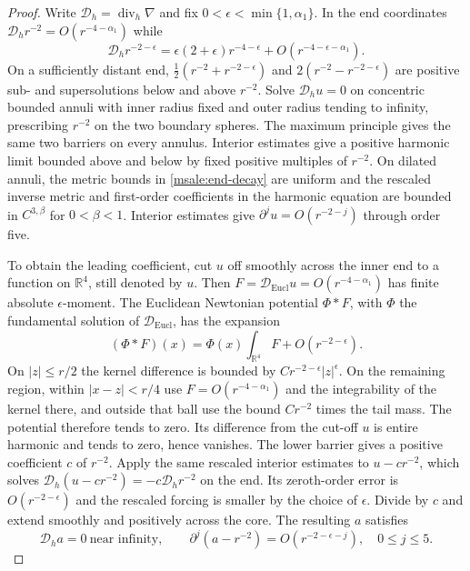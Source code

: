 \documentclass[11pt]{article}
\numberwithin{equation}{section}
\theoremstyle{definition}
\theoremstyle{remark}
\begin{document}
\begin{proof}
Write \(\mathcal D_h=\operatorname{div}_h\nabla\) and fix
\(0<\epsilon<\min\{1,\alpha_1\}\). In the end coordinates
\(\mathcal D_h r^{-2}=O(r^{-4-\alpha_1})\) while
\[
 \mathcal D_h r^{-2-\epsilon}
   =\epsilon(2+\epsilon)r^{-4-\epsilon}
                  +O(r^{-4-\epsilon-\alpha_1}).
\]
On a sufficiently distant end,
\(\tfrac12(r^{-2}+r^{-2-\epsilon})\) and
\(2(r^{-2}-r^{-2-\epsilon})\) are positive sub- and supersolutions
below and above \(r^{-2}\). Solve
\(\mathcal D_h u=0\) on concentric bounded annuli with inner
radius fixed and outer radius tending to infinity, prescribing
\(r^{-2}\) on the two boundary spheres. The maximum principle
gives the same two barriers on every annulus. Interior estimates
give a positive harmonic limit bounded above and below by fixed
positive multiples of \(r^{-2}\). On dilated annuli, the metric
bounds in \eqref{msale:end-decay} are uniform and the rescaled
inverse metric and first-order coefficients in the harmonic
equation are bounded in \(C^{3,\beta}\) for \(0<\beta<1\).
Interior estimates give \(\partial^j u=O(r^{-2-j})\) through
order five.

To obtain the leading coefficient, cut \(u\) off smoothly across
the inner end to a function on \(\mathbb R^4\), still denoted by
\(u\). Then \(F=\mathcal D_{\mathrm{Eucl}}u=O(r^{-4-\alpha_1})\)
has finite absolute \(\epsilon\)-moment. The Euclidean Newtonian
potential \(\Phi*F\), with \(\Phi\) the fundamental solution of
\(\mathcal D_{\mathrm{Eucl}}\), has the expansion
\[
 (\Phi*F)(x)=\Phi(x)\int_{\mathbb R^4}F+O(r^{-2-\epsilon}).
\]
On \(|z|\le r/2\) the kernel difference is bounded by
\(C r^{-2-\epsilon}|z|^\epsilon\). On the remaining region,
within \(|x-z|<r/4\) use \(F=O(r^{-4-\alpha_1})\) and the
integrability of the kernel there, and outside that ball use
the bound \(C r^{-2}\) times the tail mass. The potential
therefore tends to zero. Its difference from the cut-off \(u\)
is entire harmonic and tends to zero, hence vanishes.
The lower barrier gives a positive coefficient \(c\) of \(r^{-2}\).
Apply the same rescaled interior estimates to
\(u-cr^{-2}\), which solves
\(\mathcal D_h(u-cr^{-2})=-c\mathcal D_hr^{-2}\) on the end.
Its zeroth-order error is \(O(r^{-2-\epsilon})\) and the rescaled
forcing is smaller by the choice of \(\epsilon\).
Divide by \(c\) and extend smoothly and positively across the
core. The resulting \(a\) satisfies
\begin{equation}\label{msale:harmonic}
 \mathcal D_h a=0\ \text{near infinity},\qquad
 \partial^j(a-r^{-2})=O(r^{-2-\epsilon-j}),\quad 0\le j\le5.
\end{equation}


\end{proof}
\end{document}
